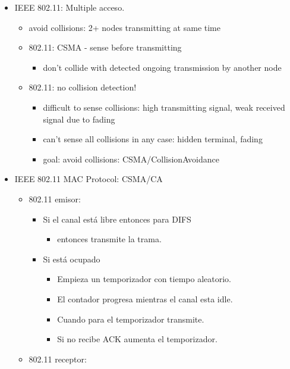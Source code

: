 \documentclass[12pt, twoside, openright]{report} %
\begin{document}
\begin{itemize}
	\item IEEE 802.11: Multiple acceso.

	      \begin{itemize}
		      \item avoid collisions: 2+ nodes transmitting at same time
		      \item 802.11: CSMA - sense before transmitting

		            \begin{itemize}
			            \item don't collide with detected ongoing transmission by
			                  another node
		            \end{itemize}
		      \item 802.11: no collision detection!

		            \begin{itemize}
			            \item difficult to sense collisions: high transmitting signal,
			                  weak received signal due to fading
			            \item can't sense all collisions in any case: hidden terminal,
			                  fading
			            \item goal: avoid collisions: CSMA/CollisionAvoidance
		            \end{itemize}
	      \end{itemize}
	\item IEEE 802.11 MAC Protocol: CSMA/CA

	      \begin{itemize}
		      \item 802.11 emisor:

		            \begin{itemize}
			            \item Si el canal está libre entonces para DIFS

			                  \begin{itemize}
				                  \item entonces transmite la trama.
			                  \end{itemize}
			            \item Si está ocupado

			                  \begin{itemize}
				                  \item Empieza un temporizador con tiempo aleatorio.
				                  \item El contador progresa mientras el canal esta idle.
				                  \item Cuando para el temporizador transmite.
				                  \item Si no recibe ACK aumenta el temporizador.
			                  \end{itemize}
		            \end{itemize}
		      \item 802.11 receptor:


\end{itemize}
\end{itemize}
\end{document}
